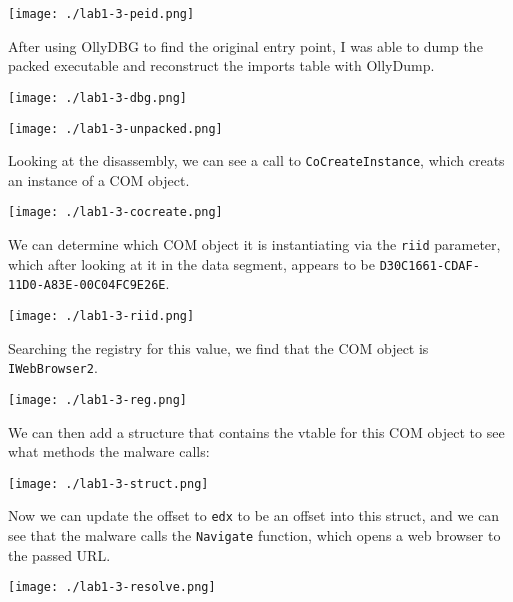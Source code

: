 \documentclass[11pt]{article}
\begin{document}
\begin{center}
\texttt{[image: ./lab1-3-peid.png]}
\end{center}

After using OllyDBG to find the original entry point, I was able to
dump the packed executable and reconstruct the imports table with
OllyDump.

\begin{center}
\texttt{[image: ./lab1-3-dbg.png]}
\end{center}

\begin{center}
\texttt{[image: ./lab1-3-unpacked.png]}
\end{center}

Looking at the disassembly, we can see a call to \texttt{CoCreateInstance},
which creats an instance of a COM object.

\begin{center}
\texttt{[image: ./lab1-3-cocreate.png]}
\end{center}

We can determine which COM object it is instantiating via the \texttt{riid}
parameter, which after looking at it in the data segment, appears to
be \texttt{D30C1661-CDAF-11D0-A83E-00C04FC9E26E}.

\begin{center}
\texttt{[image: ./lab1-3-riid.png]}
\end{center}

Searching the registry for this value, we find that the COM object is
\texttt{IWebBrowser2}.

\begin{center}
\texttt{[image: ./lab1-3-reg.png]}
\end{center}

We can then add a structure that contains the vtable for this COM
object to see what methods the malware calls:

\begin{center}
\texttt{[image: ./lab1-3-struct.png]}
\end{center}

Now we can update the offset to \texttt{edx} to be an offset into this
struct, and we can see that the malware calls the \texttt{Navigate} function,
which opens a web browser to the passed URL.

\begin{center}
\texttt{[image: ./lab1-3-resolve.png]}
\end{center}
\end{document}
